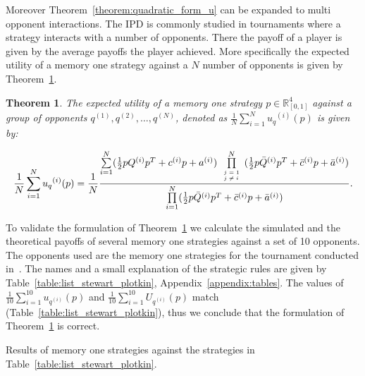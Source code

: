 \documentclass[10pt]{article}
\newtheorem{theorem}{Theorem}
\begin{document}
Moreover Theorem~\ref{theorem:quadratic_form_u} can be expanded to multi opponent
interactions. The IPD is commonly studied in tournaments where a strategy interacts
with a number of opponents. There the payoff of a player is given by the average
payoffs the player achieved. More specifically the expected utility of a memory one strategy
against a \(N\) number of opponents is given by Theorem~\ref{theorem:tournament_utility}.

\begin{theorem}\label{theorem:tournament_utility}
    The expected utility of a memory one strategy \(p\in\mathbb{R}_{[0,1]}^4\)
    against a group of opponents \(q^{(1)}, q^{(2)}, \dots, q^{(N)}\), denoted
    as \(\frac{1}{N} \sum\limits_{i=1} ^ {N} {u_q}^{(i)} (p)\) is given by:

    \begin{equation}\label{eq:tournament_utility}
        \frac{1}{N} \sum\limits_{i=1} ^ {N} {u_q}^{(i)} (p) = \frac{1}{N}
        \frac{\sum\limits_{i=1} ^ {N} (\frac{1}{2} pQ^{(i)} p^T + c^{(i)} p + a^ {(i)})
        \prod\limits_{\tiny\begin{array}{l} j=1 \\ j \neq i \end{array}} ^ 
        N (\frac{1}{2} p\bar{Q}^{(i)} p^T + \bar{c}^{(i)} p + \bar{a}^ {(i)})}
        {\prod\limits_{i=1} ^ N (\frac{1}{2} p\bar{Q}^{(i)} p^T + \bar{c}^{(i)} p + \bar{a}^ {(i)})}.
    \end{equation}

\end{theorem}

To validate the formulation of Theorem~\ref{theorem:tournament_utility} we calculate
the simulated and the theoretical payoffs of several memory one strategies against
a set of 10 opponents. The opponents used are the memory one strategies for the tournament
conducted in~\cite{Stewart2012}. The names and a small explanation of the strategic rules are
given by Table~\ref{table:list_stewart_plotkin}, Appendix~\ref{appendix:tables}.
The values of \(\frac{1}{10} \sum\limits_{i=1} ^ {10} u_{q ^{(i)}} (p)\) and
\(\frac{1}{10} \sum\limits_{i=1} ^ {10} U_{q ^{(i)}} (p)\) match (Table~\ref{table:list_stewart_plotkin}),
thus we conclude that the formulation of Theorem~\ref{theorem:tournament_utility} is correct.

\begin{table}[htbp]
    \begin{center}
    
    \end{center}
    \caption{Results of memory one strategies against the strategies in Table~\ref{table:list_stewart_plotkin}.}
    \label{table:list_stewart_plotkin}
\end{table}
\end{document}
